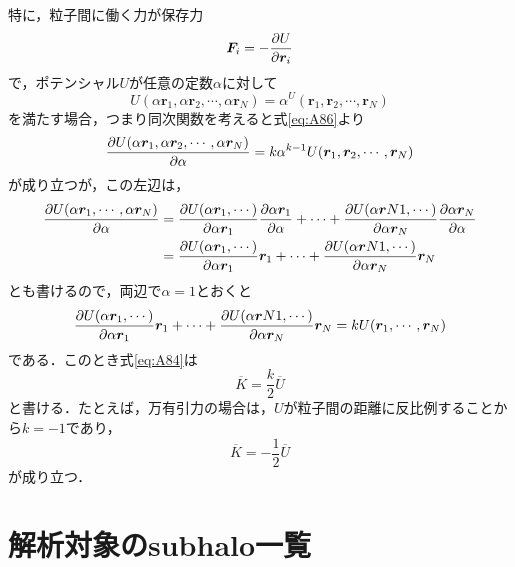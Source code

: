 \documentclass[main.tex]{subfiles}
\begin{document}
	特に，粒子間に働く力が保存力
	\begin{equation}
		\bm{F}_i = - \pdv{U}{\bm{r}_i}
	\end{equation}
	で，ポテンシャル$U$が任意の定数$\alpha$に対して
	\begin{equation}
		U(\alpha \bm{r}_1,\alpha \bm{r}_2,\cdots,\alpha \bm{r}_N) = \alpha^ U(\bm{r}_1, \bm{r}_2,\cdots,\bm{r}_N) \label{eq:A86}
	\end{equation}
	を満たす場合，つまり同次関数を考えると式\eqref{eq:A86}より
	\begin{equation}
		\pdv{U(\alpha \bm{r}_1,\alpha \bm{r}_2,\cdots,\alpha \bm{r}_N)}{\alpha} = k \alpha^{k-1} U(\bm{r}_1, \bm{r}_2,\cdots,\bm{r}_N)
	\end{equation}
	が成り立つが，この左辺は，
	\begin{align}
		\pdv{U(\alpha \bm{r}_1,\cdots,\alpha \bm{r}_N)}{\alpha} 
		&= \pdv{U(\alpha \bm{r}_1,\cdots)}{\alpha \bm{r}_1} \pdv{\alpha \bm{r}_1}{\alpha} +
		\cdots +
		\pdv{U(\alpha \bm{r}N1,\cdots)}{\alpha \bm{r}_N} \pdv{\alpha \bm{r}_N}{\alpha} \\
		&= \pdv{U(\alpha \bm{r}_1,\cdots)}{\alpha \bm{r}_1} \bm{r}_1 +
		\cdots +
		\pdv{U(\alpha \bm{r}N1,\cdots)}{\alpha \bm{r}_N}\bm{r}_N
	\end{align}
	とも書けるので，両辺で$\alpha = 1$とおくと
	\begin{equation}
		\pdv{U(\alpha \bm{r}_1,\cdots)}{\alpha \bm{r}_1} \bm{r}_1 +
		\cdots +
		\pdv{U(\alpha \bm{r}N1,\cdots)}{\alpha \bm{r}_N}\bm{r}_N
		= kU(\bm{r}_1, \cdots, \bm{r}_N)
	\end{equation}
	である．このとき式\eqref{eq:A84}は
	\begin{equation}
		\overline{K} = \frac{k}{2} \overline{U}
	\end{equation}
	と書ける．たとえば，万有引力の場合は，$U$が粒子間の距離に反比例することから$k = -1$であり，
	\begin{equation}
		\overline{K} = - \frac{1}{2} \overline{U}
	\end{equation}
	が成り立つ．
	
	\section{解析対象のsubhalo一覧}
	
\end{document}
